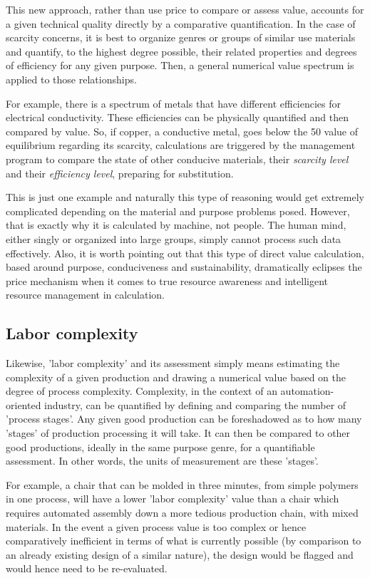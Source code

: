 \documentclass[10pt, a4paper, cleardoubleempty, openright, twoside]{book}
\begin{document}
This new approach, rather than use price to compare or assess value,
accounts for a given technical quality directly by a comparative
quantification. In the case of scarcity concerns, it is best to organize
genres or groups of similar use materials and quantify, to the highest
degree possible, their related properties and degrees of efficiency for
any given purpose. Then, a general numerical value spectrum is applied
to those relationships. 

For example, there is a spectrum of metals that have different
efficiencies for electrical conductivity. These efficiencies can be
physically quantified and then compared by value. So, if copper, a
conductive metal, goes below the 50 value of equilibrium regarding its
scarcity, calculations are triggered by the management program to
compare the state of other conducive materials, their \emph{scarcity
level} and their \emph{efficiency level}, preparing for substitution. 

This is just one example and naturally this type of reasoning would get
extremely complicated depending on the material and purpose problems
posed. However, that is exactly why it is calculated by machine, not
people. The human mind, either singly or organized into large groups,
simply cannot process such data effectively. Also, it is worth pointing
out that this type of direct value calculation, based around purpose,
conduciveness and sustainability, dramatically eclipses the price
mechanism when it comes to true resource awareness and intelligent
resource management in calculation. 

\subsection {Labor complexity}

Likewise, 'labor complexity' and its assessment simply means estimating
the complexity of a given production and drawing a numerical value based
on the degree of process complexity. Complexity, in the context of an
automation-oriented industry, can be quantified by defining and
comparing the number of 'process stages'. Any given good production can
be foreshadowed as to how many 'stages' of production processing it will
take. It can then be compared to other good productions, ideally in the
same purpose genre, for a quantifiable assessment. In other words, the
units of measurement are these 'stages'.

For example, a chair that can be molded in three minutes, from simple
polymers in one process, will have a lower 'labor complexity' value than
a chair which requires automated assembly down a more tedious production
chain, with mixed materials. In the event a given process value is too
complex or hence comparatively inefficient in terms of what is currently
possible (by comparison to an already existing design of a similar
nature), the design would be flagged and would hence need to be
re-evaluated. 
\end{document}
